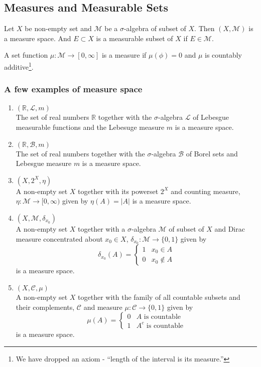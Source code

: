 \subsection{Measures and Measurable Sets}
\begin{definition}
	Let $X$ be non-empty set and $\mathcal{M}$ be a $\sigma$-algebra of subset of $X$.
	Then $(X,\mathcal{M})$ is a measure space.
	And $E \subset X$ is a measurable subset of $X$ if $E \in \mathcal{M}$.
\end{definition}
\begin{definition}[measure]
	A set function $\mu : \mathcal{M} \to [0,\infty]$ is a measure if $\mu(\phi) = 0$ and $\mu$ is countably additive\dag\footnote{
		We have dropped an axiom - ``length of the interval is its measure.''}.
\end{definition}
\subsubsection{A few examples of measure space}
\begin{enumerate}
	\item $(\mathbb{R},\mathcal{L},m)$\\
		The set of real numbers $\mathbb{R}$ together with the $\sigma$-algebra $\mathcal{L}$ of Lebesgue measurable functions and the Lebesuge measure $m$ is a measure space.
	\item $(\mathbb{R},\mathcal{B},m)$ \\
		The set of real numbers together with the $\sigma$-algebra $\mathcal{B}$ of Borel sets and Lebesgue measure $m$ is a measure space.
	\item $(X,2^X,\eta)$\\
		A non-empty set $X$ together with its powerset $2^X$ and counting measure, $\eta : \mathcal{M} \to [0,\infty)$ given by $\eta(A) = |A|$ is a measure space.
	\item $(X,\mathcal{M},\delta_{x_0})$\\
		A non-empty set $X$ together with a $\sigma$-algebra $\mathcal{M}$ of subset of $X$ and Dirac measure concentrated about $x_0 \in X$, $\delta_{x_0} : \mathcal{M} \to \{ 0,1 \}$ given by
		\[ \delta_{x_0}(A) = \begin{cases}1 & x_0 \in A \\ 0 & x_0 \notin A \end{cases} \]
			is a measure space.
	\item $(X,\mathcal{C},\mu)$ \\
		A non-empty set $X$ together with the family of all countable subsets and their complements, $\mathcal{C}$ and measure $\mu : \mathcal{C} \to \{0,1\}$ given by 
		\[ \mu(A) = \begin{cases} 0 & A \text{ is countable} \\ 1 & A^c \text{ is countable} \end{cases} \]
			is a measure space.
\end{enumerate}

